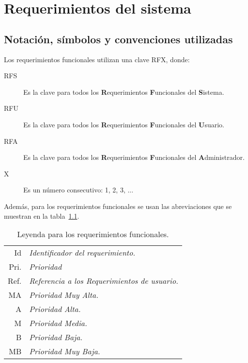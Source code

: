 \chapter{Requerimientos del sistema}
\label{cap:reqSist}

\section{Notación, símbolos y convenciones utilizadas}

	Los requerimientos funcionales utilizan una clave RFX, donde:
	
\begin{description}
	\item[RFS] Es la clave para todos los {\bf R}equerimientos {\bf F}uncionales del {\bf S}istema.
	\item[RFU] Es la clave para todos los {\bf R}equerimientos {\bf F}uncionales del {\bf U}suario.
	\item[RFA] Es la clave para todos los {\bf R}equerimientos {\bf F}uncionales del {\bf A}dministrador.
	\item[X] Es un número consecutivo: 1, 2, 3, ...
\end{description}

	Además, para los requerimientos funcionales se usan las abreviaciones que se muestran en la tabla~\ref{tbl:leyendaRF}.
\begin{table}[hbtp!]
	\begin{center}
    \begin{tabular}{|r l|}
	    \hline
    	{\footnotesize Id} & {\footnotesize\em Identificador del requerimiento.}\\
    	{\footnotesize Pri.} & {\footnotesize\em Prioridad}\\
    	{\footnotesize Ref.} & {\footnotesize\em Referencia a los Requerimientos de usuario.}\\
    	{\footnotesize MA} & {\footnotesize\em Prioridad Muy Alta.}\\
    	{\footnotesize A} & {\footnotesize\em Prioridad Alta.}\\
    	{\footnotesize M} & {\footnotesize\em Prioridad Media.}\\
    	{\footnotesize B} & {\footnotesize\em Prioridad Baja.}\\
    	{\footnotesize MB} & {\footnotesize\em Prioridad Muy Baja.}\\
		\hline
    \end{tabular} 
    \caption{Leyenda para los requerimientos funcionales.}
    \label{tbl:leyendaRF}
	\end{center}
\end{table}

